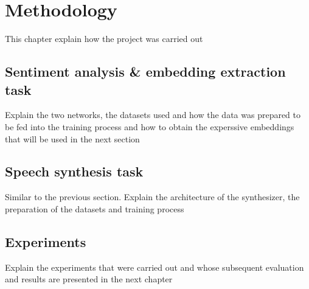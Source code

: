 \chapter{Methodology}

This chapter explain how the project was carried out

\section{Sentiment analysis \& embedding extraction task}

Explain the two networks, the datasets used and how the data was prepared to be fed into the training process and how to obtain the experssive embeddings that will be used in the next section

\section{Speech synthesis task}

Similar to the previous section. Explain the architecture of the synthesizer, the preparation of the datasets and training process

\section{Experiments}

Explain the experiments that were carried out and whose subsequent evaluation and results are presented in the next chapter
